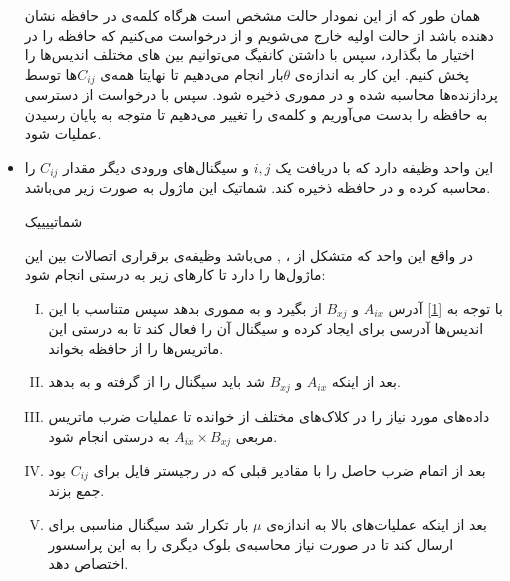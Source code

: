 \documentclass[12pt,onecolumn,a4paper,fleqn]{article}
\begin{document}
\begin{itemize}
همان طور که از این نمودار حالت مشخص است هرگاه کلمه‌ی  در حافظه نشان‌ دهنده  باشد از حالت اولیه‌ خارج می‌شویم و از  درخواست می‌کنیم که حافظه‌ را در اختیار ما بگذارد، سپس با داشتن کانفیگ می‌توانیم بین ‌‌های مختلف اندیس‌ها را پخش کنیم. این کار به اندازه‌ی $\theta$بار انجام می‌دهیم تا نهایتا همه‌ی $C_{ij}$‌ها توسط پردازنده‌ها محاسبه شده و در مموری ذخیره شود. سپس با درخواست از  دسترسی به حافظه را بدست می‌آوریم و کلمه‌ی  را تغییر می‌دهیم تا  متوجه به پایان رسیدن عملیات شود.

\pagebreak

\item 
{}

این واحد وظیفه‌ دارد که با دریافت یک $i,j$ و سیگنال‌های ورودی دیگر مقدار $C_{ij}$ را محاسبه کرده و در حافظه ذخیره کند. شماتیک این ماژول به صورت زیر می‌باشد. 

شماتییییک

در واقع این واحد که متشکل از  ،
,
می‌باشد وظیفه‌ی برقراری اتصالات بین این ماژول‌ها را دارد تا کارهای زیر به درستی انجام شود:

\begin{enumerate}[(I)]
	\item 
	با توجه به \autoref{1}
	آدرس
	  $A_{ix}$ و $B_{xj}$
	  از 	    بگیرد و به مموری بدهد سپس متناسب با این اندیس‌ها آدرسی برای  ایجاد کرده و سیگنال  آن را فعال کند تا  به درستی این ماتریس‌ها را از حافظه بخواند.
	  
	  \item 
	  بعد از اینکه  	  $A_{ix}$ و $B_{xj}$ شد باید سیگنال  را از  گرفته و به  بدهد.
	  
	  \item 
	  داده‌های مورد نیاز  را در کلاک‌های مختلف از  خوانده تا عملیات ضرب ماتریس مربعی 	  $A_{ix}\times B_{xj}$ به درستی انجام شود.
	  
	  \item 
	  بعد از اتمام ضرب حاصل را با مقادیر قبلی که در رجیستر فایل برای $C_{ij}$ بود جمع بزند.
	  
	  \item
	 بعد از اینکه عملیات‌های بالا به اندازه‌ی $\mu$ بار تکرار شد سیگنال مناسبی برای  ارسال کند تا در صورت نیاز  محاسبه‌ی بلوک دیگری را به این پراسسور اختصاص دهد.
	   

\end{enumerate}
\end{itemize}
\end{document}
